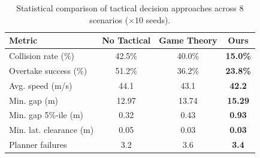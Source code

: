 \begin{table}[t]
\centering
\caption{Statistical comparison of tactical decision approaches across 8 scenarios (\(\times 10\) seeds).}
\label{tab:comparison}
\begin{tabular}{lccc}
\toprule
Metric & No Tactical & Game Theory & \textbf{Ours} \\
\midrule
Collision rate (\%) & 42.5\% & 40.0\% & \textbf{15.0\%} \\
Overtake success (\%) & 51.2\% & 36.2\% & \textbf{23.8\%} \\
Avg. speed (m/s) & 44.1 & 43.1 & \textbf{42.2} \\
Min. gap (m) & 12.97 & 13.74 & \textbf{15.29} \\
Min. gap 5\%-ile (m) & 0.32 & 0.43 & \textbf{0.93} \\
Min. lat. clearance (m) & 0.05 & 0.03 & \textbf{0.03} \\
Planner failures & 3.2 & 3.6 & \textbf{3.4} \\
\bottomrule
\end{tabular}
\end{table}